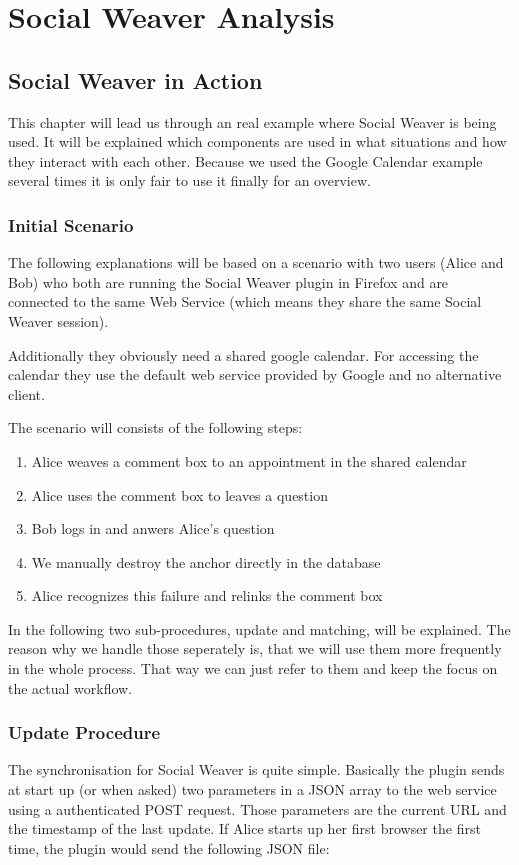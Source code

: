 \section{Social Weaver Analysis}
\subsection{Social Weaver in Action}
This chapter will lead us through an real example where Social Weaver is being used. It will be explained which components are used in what situations and how they interact with each other. Because we used the Google Calendar example several times it is only fair to use it finally for an overview.

\subsubsection*{Initial Scenario}
The following explanations will be based on a scenario with two users (Alice and Bob) who both are running the Social Weaver plugin in Firefox and are connected to the same Web Service (which means they share the same Social Weaver session). 

Additionally they obviously need a shared google calendar. For accessing the calendar they use the default web service provided by Google and no alternative client. 

The scenario will consists of the following steps:
\begin{enumerate}
	\item Alice weaves a comment box to an appointment in the shared calendar
	\item Alice uses the comment box to leaves a question
	\item Bob logs in and anwers Alice's question
	\item We manually destroy the anchor directly in the database
	\item Alice recognizes this failure and relinks the comment box
\end{enumerate}

In the following two sub-procedures, update and matching, will be explained. The reason why we handle those seperately is, that we will use them more frequently in the whole process. That way we can just refer to them and keep the focus on the actual workflow. 

\subsubsection*{Update Procedure}
The synchronisation for Social Weaver is quite simple. Basically the plugin sends at start up (or when asked) two parameters in a JSON array to the web service using a authenticated POST request. Those parameters are the current URL and the timestamp of the last update. If Alice starts up her first browser the first time, the plugin would send the following JSON file:

